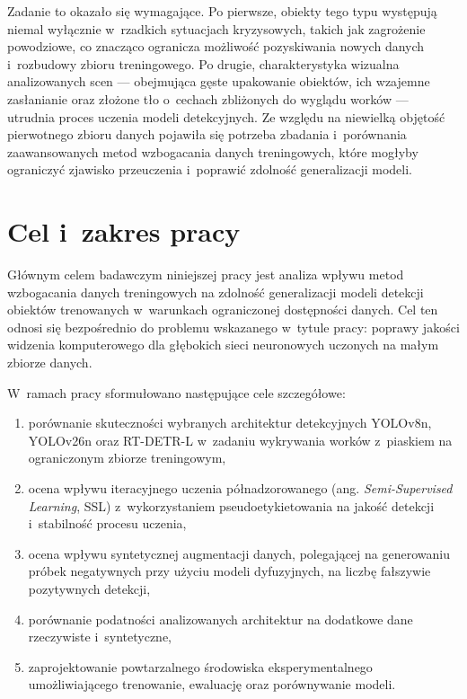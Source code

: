 Zadanie to okazało się wymagające. Po pierwsze, obiekty tego typu występują niemal wyłącznie w~rzadkich sytuacjach kryzysowych, takich jak zagrożenie powodziowe, co znacząco ogranicza możliwość pozyskiwania nowych danych i~rozbudowy zbioru treningowego. Po drugie, charakterystyka wizualna analizowanych scen — obejmująca gęste upakowanie obiektów, ich wzajemne zasłanianie oraz złożone tło o~cechach zbliżonych do wyglądu worków — utrudnia proces uczenia modeli detekcyjnych. Ze względu na niewielką objętość pierwotnego zbioru danych pojawiła się potrzeba zbadania i~porównania zaawansowanych metod wzbogacania danych treningowych, które mogłyby ograniczyć zjawisko przeuczenia i~poprawić zdolność generalizacji modeli.


\section{Cel i~zakres pracy}

Głównym celem badawczym niniejszej pracy jest analiza wpływu metod wzbogacania danych treningowych na zdolność generalizacji modeli detekcji obiektów trenowanych w~warunkach ograniczonej dostępności danych. Cel ten odnosi się bezpośrednio do problemu wskazanego w~tytule pracy: poprawy jakości widzenia komputerowego dla głębokich sieci neuronowych uczonych na małym zbiorze danych.

W~ramach pracy sformułowano następujące cele szczegółowe:
\begin{enumerate}
    \item porównanie skuteczności wybranych architektur detekcyjnych YOLOv8n, YOLOv26n oraz RT-DETR-L w~zadaniu wykrywania worków z~piaskiem na ograniczonym zbiorze treningowym,
    \item ocena wpływu iteracyjnego uczenia półnadzorowanego (ang. \textit{Semi-Supervised Learning}, SSL) z~wykorzystaniem pseudoetykietowania na jakość detekcji i~stabilność procesu uczenia,
    \item ocena wpływu syntetycznej augmentacji danych, polegającej na generowaniu próbek negatywnych przy użyciu modeli dyfuzyjnych, na liczbę fałszywie pozytywnych detekcji,
    \item porównanie podatności analizowanych architektur na dodatkowe dane rzeczywiste i~syntetyczne,
    \item zaprojektowanie powtarzalnego środowiska eksperymentalnego umożliwiającego trenowanie, ewaluację oraz porównywanie modeli.
\end{enumerate}

